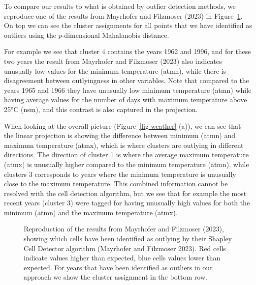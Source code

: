 \documentclass[
  12pt,
]{interact}
\begin{document}
To compare our results to what is obtained by outlier detection methods,
we reproduce one of the results from Mayrhofer and Filzmoser (2023) in
Figure~\ref{fig-shapley}. On top we can see the cluster assignments for
all points that we have identified as outliers using the
\(p\)-dimensional Mahalanobis distance.

For example we see that cluster 4 contains the years 1962 and 1996, and
for these two years the result from Mayrhofer and Filzmoser (2023) also
indicates unusually low values for the minimum temperature (atmn), while
there is disagreement between outlyingness in other variables. Note that
compared to the years 1965 and 1966 they have unusually low minimum
temperature (atmn) while having average values for the number of days
with maximum temperature above 25°C (nsm), and this contrast is also
captured in the projection.

When looking at the overall picture (Figure~\ref{fig-weather} (a)), we
can see that the linear projection is showing the difference between
minimum (atmn) and maximum temperature (atmx), which is where clusters
are outlying in different directions. The direction of cluster 1 is
where the average maximum temperature (atmx) is unusually higher
compared to the minimum temperature (atmn), while clusters 3 corresponds
to years where the minimum temperature is unusually close to the maximum
temperature. This combined information cannot be resolved with the cell
detection algorithm, but we see that for example the most recent years
(cluster 3) were tagged for having unusually high values for both the
minimum (atmn) and the maximum temperature (atmx).

\begin{figure}


\caption{\label{fig-shapley}Reproduction of the results from Mayrhofer
and Filzmoser (2023), showing which cells have been identified as
outlying by their Shapley Cell Detector algorithm (Mayrhofer and
Filzmoser 2023). Red cells indicate values higher than expected, blue
cells values lower than expected. For years that have been identified as
outliers in our approach we show the cluster assignment in the bottom
row.}

\end{figure}%
\end{document}
